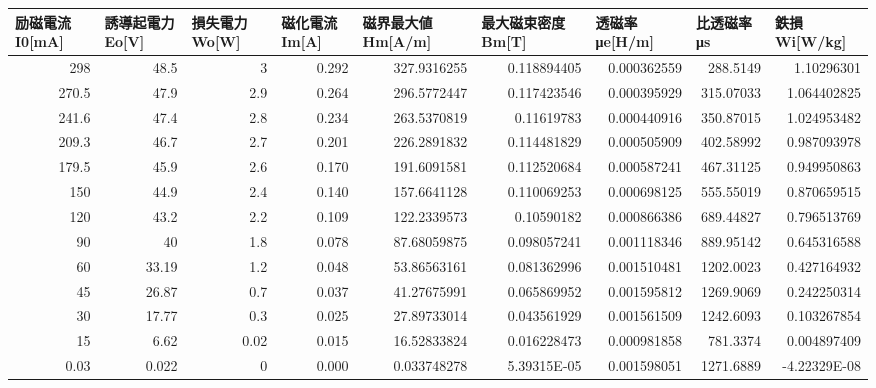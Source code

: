 \begin{tabular}{rrrrrrrrr}
\toprule
\multicolumn{1}{l}{励磁電流I0[mA]} & \multicolumn{1}{l}{誘導起電力Eo[V]} & \multicolumn{1}{l}{損失電力Wo[W]} & \multicolumn{1}{l}{磁化電流Im[A]} & \multicolumn{1}{l}{磁界最大値Hm[A/m]} & \multicolumn{1}{l}{最大磁束密度Bm[T]} & \multicolumn{1}{l}{透磁率μe[H/m]} & \multicolumn{1}{l}{比透磁率μs} & \multicolumn{1}{l}{鉄損Wi[W/kg]} \\
\midrule
298   & 48.5  & 3     & 0.292 & 327.9316255 & 0.118894405 & 0.000362559 & 288.5149 & 1.10296301 \\
270.5 & 47.9  & 2.9   & 0.264 & 296.5772447 & 0.117423546 & 0.000395929 & 315.07033 & 1.064402825 \\
241.6 & 47.4  & 2.8   & 0.234 & 263.5370819 & 0.11619783 & 0.000440916 & 350.87015 & 1.024953482 \\
209.3 & 46.7  & 2.7   & 0.201 & 226.2891832 & 0.114481829 & 0.000505909 & 402.58992 & 0.987093978 \\
179.5 & 45.9  & 2.6   & 0.170 & 191.6091581 & 0.112520684 & 0.000587241 & 467.31125 & 0.949950863 \\
150   & 44.9  & 2.4   & 0.140 & 157.6641128 & 0.110069253 & 0.000698125 & 555.55019 & 0.870659515 \\
120   & 43.2  & 2.2   & 0.109 & 122.2339573 & 0.10590182 & 0.000866386 & 689.44827 & 0.796513769 \\
90    & 40    & 1.8   & 0.078 & 87.68059875 & 0.098057241 & 0.001118346 & 889.95142 & 0.645316588 \\
60    & 33.19 & 1.2   & 0.048 & 53.86563161 & 0.081362996 & 0.001510481 & 1202.0023 & 0.427164932 \\
45    & 26.87 & 0.7   & 0.037 & 41.27675991 & 0.065869952 & 0.001595812 & 1269.9069 & 0.242250314 \\
30    & 17.77 & 0.3   & 0.025 & 27.89733014 & 0.043561929 & 0.001561509 & 1242.6093 & 0.103267854 \\
15    & 6.62  & 0.02  & 0.015 & 16.52833824 & 0.016228473 & 0.000981858 & 781.3374 & 0.004897409 \\
0.03  & 0.022 & 0     & 0.000 & 0.033748278 & 5.39315E-05 & 0.001598051 & 1271.6889 & -4.22329E-08 \\
\bottomrule
\end{tabular}